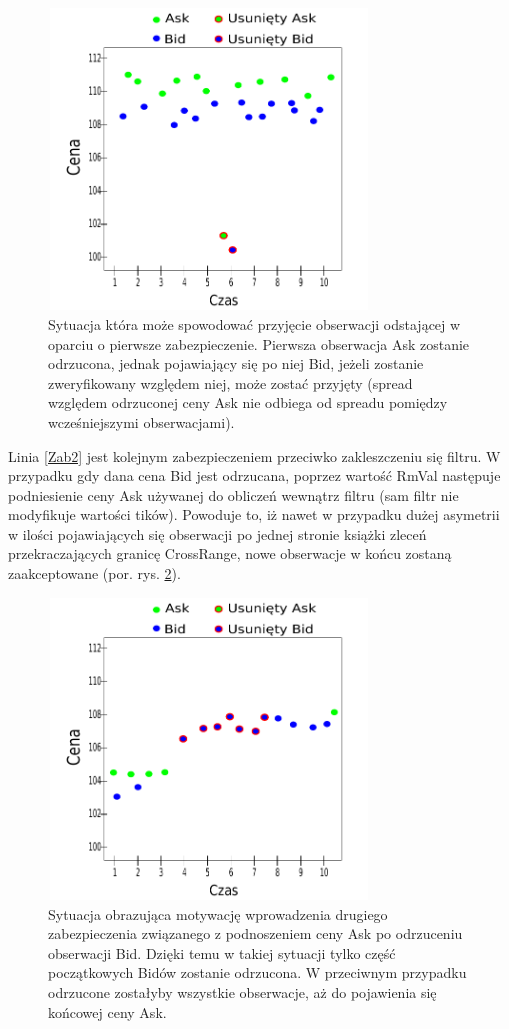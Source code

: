 \documentclass[a4paper,12pt,openany, DIV=calc, headsepline]{scrbook}
\begin{document}
\begin{figure}[h]
  \centering
  \includegraphics[width=85mm, height=80mm]{wykresy/nextout}
  \caption{Sytuacja która może spowodować przyjęcie obserwacji odstającej w oparciu o pierwsze zabezpieczenie. Pierwsza obserwacja Ask zostanie odrzucona, jednak pojawiający się po niej Bid, jeżeli zostanie zweryfikowany względem niej, może zostać przyjęty (spread względem odrzuconej ceny Ask nie odbiega od spreadu pomiędzy wcześniejszymi obserwacjami).}
  \label{fig:NEXTOUT}
\end{figure}

Linia \ref{Zab2} jest kolejnym zabezpieczeniem przeciwko zakleszczeniu się filtru. W przypadku gdy dana cena Bid jest odrzucana, poprzez wartość RmVal następuje  podniesienie ceny Ask używanej do obliczeń wewnątrz filtru (sam filtr nie modyfikuje wartości tików). Powoduje to, iż nawet w przypadku dużej asymetrii w ilości pojawiających się obserwacji po jednej stronie książki zleceń przekraczających granicę CrossRange, nowe obserwacje w końcu zostaną zaakceptowane (por. rys. \ref{fig:longStreak}).

\begin{figure}[h]
  \centering
  \includegraphics[width=85mm, height=80mm]{wykresy/longStreak}
  \caption{Sytuacja obrazująca motywację wprowadzenia drugiego zabezpieczenia związanego z podnoszeniem ceny Ask po odrzuceniu obserwacji Bid. Dzięki temu w takiej sytuacji tylko część początkowych Bidów zostanie odrzucona. W przeciwnym przypadku odrzucone zostałyby wszystkie obserwacje, aż do pojawienia się końcowej ceny Ask.}
  \label{fig:longStreak}
\end{figure}
\end{document}
